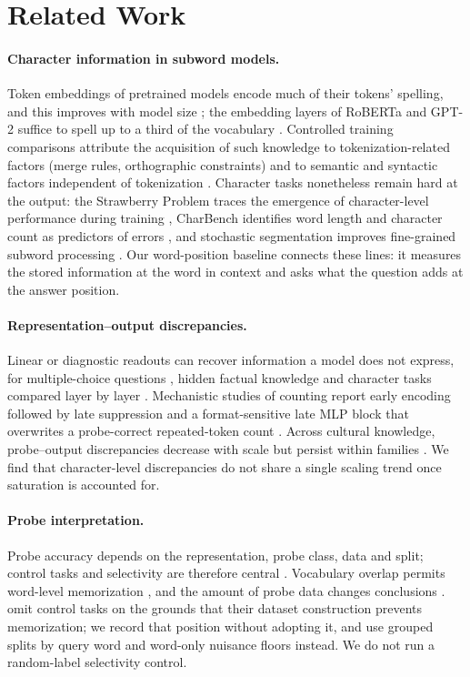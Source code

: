 \section{Related Work}
\label{sec:related}

\paragraph{Character information in subword models.}
Token embeddings of pretrained models encode much of their tokens' spelling, and this improves
with model size \citep{kaushal2022tokens}; the embedding layers of RoBERTa and GPT-2 suffice to
spell up to a third of the vocabulary \citep{itzhak2022spelling}. Controlled training comparisons
attribute the acquisition of such knowledge to tokenization-related factors (merge rules,
orthographic constraints) and to semantic and syntactic factors independent of tokenization
\citep{sato2026acquire}. Character tasks nonetheless remain hard at the output: the Strawberry
Problem traces the emergence of character-level performance during training \citep{strawberry},
CharBench identifies word length and character count as predictors of errors \citep{charbench},
and stochastic segmentation improves fine-grained subword processing \citep{stochastok}. Our
word-position baseline connects these lines: it measures the stored information at the word in
context and asks what the question adds at the answer position.

\paragraph{Representation--output discrepancies.}
Linear or diagnostic readouts can recover information a model does not express, for
multiple-choice questions \citep{kappa}, hidden factual knowledge \citep{inside_out} and character
tasks compared layer by layer \citep{hiraoka_inui}. Mechanistic studies of counting report early
encoding followed by late suppression \citep{early_encode} and a format-sensitive late MLP block
that overwrites a probe-correct repeated-token count \citep{repeated_token}. Across cultural
knowledge, probe--output discrepancies decrease with scale but persist within families
\citep{chelombitko2026cultural}. We find that character-level discrepancies do not share a single
scaling trend once saturation is accounted for.

\paragraph{Probe interpretation.}
Probe accuracy depends on the representation, probe class, data and split; control tasks and
selectivity are therefore central \citep{hewitt2019control,belinkov2022probing}. Vocabulary overlap
permits word-level memorization \citep{rosa2020memorization,dhar2020vocab}, and the amount of
probe data changes conclusions \citep{voita2020mdl,zhu2022data}. \citet{early_encode} omit control
tasks on the grounds that their dataset construction prevents memorization; we record that
position without adopting it, and use grouped splits by query word and word-only nuisance floors
instead. We do not run a random-label selectivity control.

